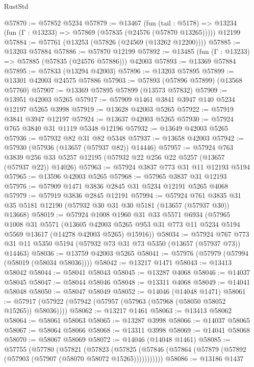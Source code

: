 \begin{lexlean}{RustStd}
\begin{coremodule}
@57870 := @57852 @5234
@57879 := @13467
    (fun (tail : @5178) => @13234 (fun (Γ : @13233) => @57869 (@57835 (@24576 (@57870 @13265)))))
    @12199
@57884 := @57761 (@13253 (@57826 (@24569 (@13262 @12200))))
@57885 := @13203 @57884
@57886 := @57870 @12199
@57892 := @13485 (fun (Γ : @13233) => @57885 (@57835 (@24576 @57886))) @42003
@57893 := @13369 @57884
@57895 := @57833 (@13294 @42003)
@57896 := @13203 @57895
@57899 := @13301 @42003 @24575 @57886
@57903 := @57893 (@57896 @57899) (@13568 @57760)
@57907 := @13369 @57895 @57899 (@13573 @57832)
@57909 := @13951 @42003 @5265
@57917 := @57909 @1461 @3841 @3947 @140 @5234 @12197 @5265 @3998
@57919 := @13628 @42003 @5265
@57922 := @57919 @3841 @3947 @12197
@57924 := @13637 @42003 @5265
@57930 := @57924 @765 @3840 @31 @1119 @5348 @12196
@57932 := @13649 @42003 @5265
@57936 := @57932 @82 @31 @82 @5348
@57937 := @13658 @42003
@57942 := @57930 (@57936 (@13657 (@57937 @82)) @14446)
@57957 := @57924
    @763
    @3839
    @256
    @33
    @5257
    @12195
    (@57932 @22 @256 @22 @5257 (@13657 (@57937 @22)) @14026)
@57963 := @57924 @3837 @773 @31 @11 @12193 @5194
@57965 := @13596 @42003 @5265
@57968 := @57965 @3837 @31 @12193
@57976 := @57909 @1471 @3836 @2845 @31 @5234 @12191 @5265 @4068
@57979 := @57919 @3836 @2845 @12191
@57994 := @57924
    @761
    @3835
    @31
    @35
    @5181
    @12190
    (@57932 @30 @31 @30 @5181 (@13657 (@57937 @30)) @13668)
@58019 := @57924
    @1008
    @1960
    @31
    @33
    @5571
    @6934
    (@57965
      @1008
      @31
      @5571
      (@13605 @42003 @5265 @953 @31 @773 @11 @5234 @5194 @5569 @13617 (@14278 @42003 @5265) @15916))
@58034 := @57924
    @767
    @773
    @31
    @11
    @5350
    @5194
    (@57932 @73 @31 @73 @5350 (@13657 (@57937 @73)) @14463)
@58036 := @13759 @42003 @5265
@58041 := @57976 (@57979 (@57994 (@58019 (@58034 @58036))))
@58042 := @13217 @1471
@58043 := @13413 @58042
@58044 := @58041 @58043
@58045 := @13287 @4068
@58046 := @14037 @58045
@58047 := @58044 @58046
@58048 := @13311 @4068
@58049 := @14041 @58048
@58050 := @58047 @58049
@58052 := @14046 (@14048 @1471)
@58061 := @57917 (@57922 (@57942 (@57957 (@57963 (@57968 (@58050 @58052 @15265)) @58036))))
@58062 := @13217 @1461
@58063 := @13413 @58062
@58064 := @58061 @58063
@58065 := @13287 @3998
@58066 := @14037 @58065
@58067 := @58064 @58066
@58068 := @13311 @3998
@58069 := @14041 @58068
@58070 := @58067 @58069
@58072 := @14046 (@14048 @1461)
@58085 := @57755
    (@57780
      (@57821
        (@57823
          (@57825 (@57846 (@57864 (@57879 (@57892 (@57903 (@57907 (@58070 @58072 @15265)))))))))))
@58086 := @13186 @1437

\end{coremodule}
\end{lexlean}
